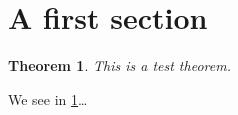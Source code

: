 \documentclass{book}
\theoremstyle{plain}
\newtheorem{thm}{Theorem}
\begin{document}
  
  \section{A first section}
  \begin{thm}\label{testthm}
  This is a test theorem. 
  \end{thm}
  We see in \cref{testthm}\dots
  
  
\end{document}
